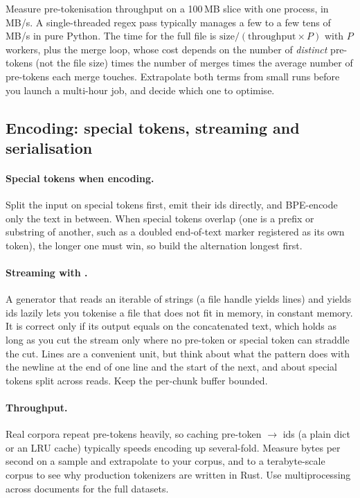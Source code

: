 \begin{napkinmath}
Measure pre-tokenisation throughput on a 100\,MB slice with one process, in MB/s. A
single-threaded regex pass typically manages a few to a few tens of MB/s in pure Python. The
time for the full file is $\text{size}/(\text{throughput}\times P)$ with $P$ workers, plus the
merge loop, whose cost depends on the number of \emph{distinct} pre-tokens (not the file size)
times the number of merges times the average number of pre-tokens each merge touches.
Extrapolate both terms from small runs before you launch a multi-hour job, and decide which one
to optimise.
\end{napkinmath}

\subsection{Encoding: special tokens, streaming and serialisation}\label{sec:proj1:stream}

\paragraph{Special tokens when encoding.} Split the input on special tokens first, emit their
ids directly, and BPE-encode only the text in between. When special tokens overlap (one is a
prefix or substring of another, such as a doubled end-of-text marker registered as its own
token), the longer one must win, so build the alternation longest first.

\paragraph{Streaming with .} A generator that reads an iterable of strings
(a file handle yields lines) and yields ids lazily lets you tokenise a file that does not fit in
memory, in constant memory. It is correct only if its output equals  on the
concatenated text, which holds as long as you cut the stream only where no pre-token or special
token can straddle the cut. Lines are a convenient unit, but think about what the pattern does
with the newline at the end of one line and the start of the next, and about special tokens split
across reads. Keep the per-chunk buffer bounded.

\paragraph{Throughput.} Real corpora repeat pre-tokens heavily, so caching pre-token $\to$ ids
(a plain dict or an LRU cache) typically speeds encoding up several-fold. Measure bytes per second
on a sample and extrapolate to your corpus, and to a terabyte-scale corpus to see why
production tokenizers are written in Rust. Use multiprocessing across documents for the full
datasets.

